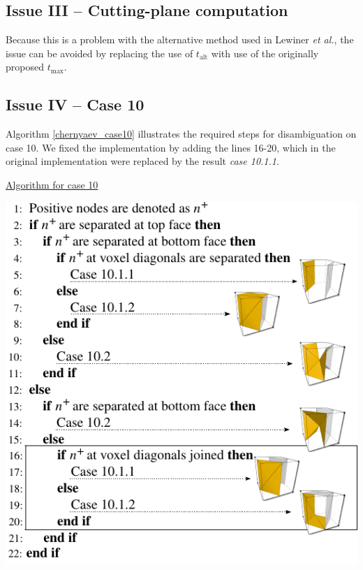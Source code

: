 \subsection{Issue III -- Cutting-plane computation}

Because this is a problem with the alternative method used in Lewiner \emph{et al.}, the issue can be avoided by replacing the use of $t_{\mathrm{alt}}$ with use of the originally proposed $t_{\mathrm{max}}$.

\subsection{Issue IV -- Case 10}

Algorithm \ref{chernyaev_case10} illustrates the required steps for disambiguation on case 10. We fixed the \mc{} implementation by adding the lines 16-20, which in the original implementation were replaced by the result \textit{case 10.1.1}. 



\begin{algorithm}
\caption{\href{http://liscustodio.github.io/C_MC33/alg2.html}{Algorithm for case 10} \cite{lisOnline2013}}
\label{chernyaev_case10}
\includegraphics[width=0.7\linewidth]{chapter4/figures/algorithm.pdf}
\end{algorithm}


